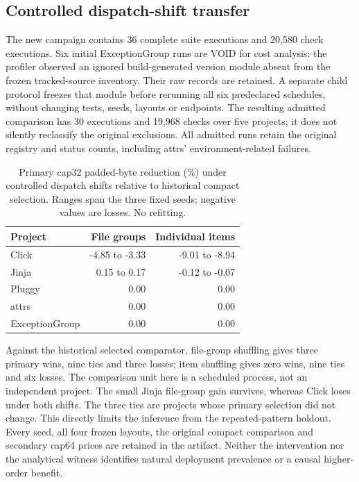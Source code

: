 \subsection{Controlled dispatch-shift transfer}
The new campaign contains 36 complete suite executions and 20,580 check
executions. Six initial ExceptionGroup runs are VOID for cost analysis:
the profiler observed an ignored build-generated version module absent from
the frozen tracked-source inventory. Their raw records are retained. A
separate child protocol freezes that module before rerunning all six
predeclared schedules, without changing tests, seeds, layouts or endpoints.
The resulting admitted comparison has 30 executions and 19,968 checks over
five projects; it does not silently reclassify the original exclusions.
All admitted runs retain the original registry and status counts, including
attrs' environment-related failures.

\begin{table}[t]\centering\footnotesize
\caption{Primary cap32 padded-byte reduction (\%) under controlled dispatch
shifts relative to historical compact selection. Ranges span the three
fixed seeds; negative values are losses. No refitting.}
\label{tab:v12-shifts}
\begin{tabular}{@{}lrr@{}}\toprule
Project & File groups & Individual items\\\midrule
Click & -4.85 to -3.33 & -9.01 to -8.94 \\
Jinja & 0.15 to 0.17 & -0.12 to -0.07 \\
Pluggy & 0.00 & 0.00 \\
attrs & 0.00 & 0.00 \\
ExceptionGroup & 0.00 & 0.00 \\
\bottomrule\end{tabular}\end{table}

Against the historical selected comparator, file-group shuffling gives
three primary wins, nine ties and three losses; item shuffling gives zero
wins, nine ties and six losses. The comparison unit here is a scheduled
process, not an independent project. The small Jinja file-group gain survives,
whereas Click loses under both shifts. The three ties are projects whose
primary selection did not change. This directly limits the inference from
the repeated-pattern holdout. Every seed, all four frozen layouts, the
original compact comparison and secondary cap64 prices are retained in
the artifact. Neither the intervention nor the analytical witness identifies
natural deployment prevalence or a causal higher-order benefit.

